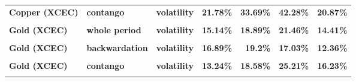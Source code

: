 \documentclass[
  authoryear,
  preprint,
  3p]{elsarticle}
\begin{document}
\begin{longtable}[t]{>{}l>{}l>{}l>{}r>{}r>{}r>{}r}
\textbf{Copper (XCEC)} & \textbf{contango} & \textbf{volatility} & \textcolor[HTML]{4285f4}{\textbf{21.78\%}} & \textcolor[HTML]{4285f4}{\textbf{33.69\%}} & \textcolor[HTML]{4285f4}{\textbf{42.28\%}} & \textcolor[HTML]{4285f4}{\textbf{20.87\%}}\\
\addlinespace
\textbf{\cellcolor{gray!10}{Gold (XCEC)}} & \textbf{\cellcolor{gray!10}{whole period}} & \textbf{\cellcolor{gray!10}{mean}} & \textcolor[HTML]{4285f4}{\textbf{\cellcolor{gray!10}{4.5\%}}} & \textcolor[HTML]{4285f4}{\textbf{\cellcolor{gray!10}{14.35\%}}} & \textcolor[HTML]{4285f4}{\textbf{\cellcolor{gray!10}{14.01\%}}} & \textcolor[HTML]{4285f4}{\textbf{\cellcolor{gray!10}{0.53\%}}}\\
\textbf{Gold (XCEC)} & \textbf{whole period} & \textbf{volatility} & \textcolor[HTML]{4285f4}{\textbf{15.14\%}} & \textcolor[HTML]{4285f4}{\textbf{18.89\%}} & \textcolor[HTML]{4285f4}{\textbf{21.46\%}} & \textcolor[HTML]{4285f4}{\textbf{14.41\%}}\\
\textbf{\cellcolor{gray!10}{Gold (XCEC)}} & \textbf{\cellcolor{gray!10}{backwardation}} & \textbf{\cellcolor{gray!10}{mean}} & \textcolor[HTML]{4285f4}{\textbf{\cellcolor{gray!10}{9.19\%}}} & \textcolor[HTML]{4285f4}{\textbf{\cellcolor{gray!10}{13.37\%}}} & \textcolor[HTML]{4285f4}{\textbf{\cellcolor{gray!10}{9.37\%}}} & \textcolor[HTML]{4285f4}{\textbf{\cellcolor{gray!10}{4.21\%}}}\\
\textbf{Gold (XCEC)} & \textbf{backwardation} & \textbf{volatility} & \textcolor[HTML]{4285f4}{\textbf{16.89\%}} & \textcolor[HTML]{4285f4}{\textbf{19.2\%}} & \textcolor[HTML]{4285f4}{\textbf{17.03\%}} & \textcolor[HTML]{4285f4}{\textbf{12.36\%}}\\
\textbf{\cellcolor{gray!10}{Gold (XCEC)}} & \textbf{\cellcolor{gray!10}{contango}} & \textbf{\cellcolor{gray!10}{mean}} & \textcolor[HTML]{4285f4}{\textbf{\cellcolor{gray!10}{-0.01\%}}} & \textcolor[HTML]{4285f4}{\textbf{\cellcolor{gray!10}{15.37\%}}} & \textcolor[HTML]{4285f4}{\textbf{\cellcolor{gray!10}{19.1\%}}} & \textcolor[HTML]{4285f4}{\textbf{\cellcolor{gray!10}{-3.1\%}}}\\
\addlinespace
\textbf{Gold (XCEC)} & \textbf{contango} & \textbf{volatility} & \textcolor[HTML]{4285f4}{\textbf{13.24\%}} & \textcolor[HTML]{4285f4}{\textbf{18.58\%}} & \textcolor[HTML]{4285f4}{\textbf{25.21\%}} & \textcolor[HTML]{4285f4}{\textbf{16.23\%}}\\
\textbf{\cellcolor{gray!10}{Palladium (XNYM)}} & \textbf{\cellcolor{gray!10}{whole period}} & \textbf{\cellcolor{gray!10}{mean}} & \textcolor[HTML]{4285f4}{\textbf{\cellcolor{gray!10}{9.12\%}}} & \textcolor[HTML]{4285f4}{\textbf{\cellcolor{gray!10}{9.03\%}}} & \textcolor[HTML]{4285f4}{\textbf{\cellcolor{gray!10}{*29.12\%}}} & \textcolor[HTML]{4285f4}{\textbf{\cellcolor{gray!10}{13.75\%}}}\\

\end{longtable}
\end{document}

